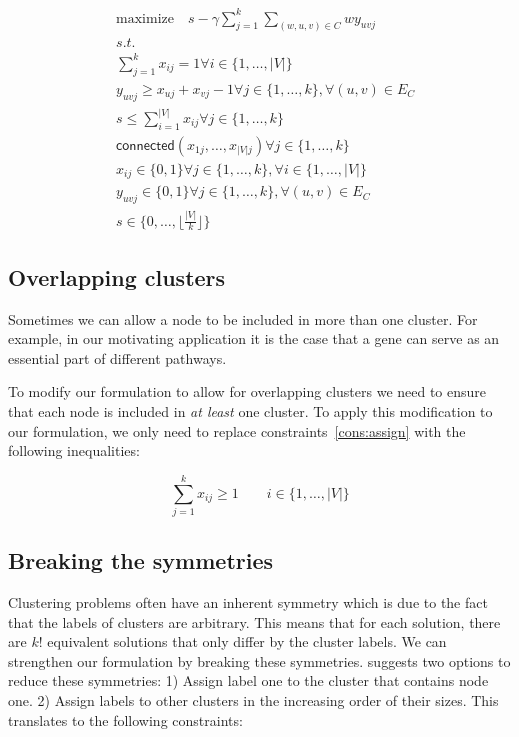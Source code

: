 \documentclass[conference,compsoc]{IEEEtran}
\begin{document}
\begin{align}
& \text{maximize} \quad s - \gamma \sum_{j=1}^{k} \sum_{(w, u, v) \in C} w  y_{uvj}  \\
&\textit{s.t.}                                                                       \nonumber \\
&\sum_{j=1}^k x_{ij} = 1                                                             \forall i \in \{1, \ldots, |V|\} \\
& y_{uvj} \geq x_{uj} + x_{vj} -1                                                    \forall j \in \{1, \ldots, k\}, \forall (u, v) \in E_{C} \\
& s \leq \sum_{i=1}^{|V|} x_{ij}                                                     \forall j \in \{1, \ldots, k\} \\
& \mathsf{connected}(x_{1j}, \ldots, x_{|V|j})                                       \forall j \in \{1, \ldots, k\} \\
& x_{ij} \in \{0, 1\}                                                                \forall j \in \{1, \ldots, k\}, \forall i \in \{1, \ldots, |V|\} \\
& y_{uvj} \in \{0, 1\}                                                               \forall j \in \{1, \ldots, k\}, \forall (u, v) \in E_{C} \\
& s \in \{0, \ldots, \lfloor \frac{|V|}{k} \rfloor \}                                  
\end{align}

\subsection{Overlapping clusters}
Sometimes we can allow a node to be included in more than one cluster. For example, in our motivating application it is the case that a gene can serve as an essential part of different pathways. 

To modify our formulation to allow for overlapping clusters we need to ensure that each node is included in \emph{at least} one cluster. To apply this modification to our formulation, we only need to replace constraints~\ref{cons:assign} with the following inequalities:

\begin{equation}
\sum_{j=1}^{k} x_{ij} \geq 1 \qquad i \in \{1, \ldots, |V| \}
\end{equation}

\subsection{Breaking the symmetries}
Clustering problems often have an inherent symmetry which is due to the fact that the labels of clusters are arbitrary. This means that for each solution, there are $k!$ equivalent solutions that only differ by the cluster labels. We can strengthen our formulation by breaking these symmetries. \cite{SheraliD05a} suggests two options to reduce these symmetries: 1) Assign label one to the cluster that contains node one. 2) Assign labels to other clusters in the increasing order of their sizes. This translates to the following constraints:
\end{document}
